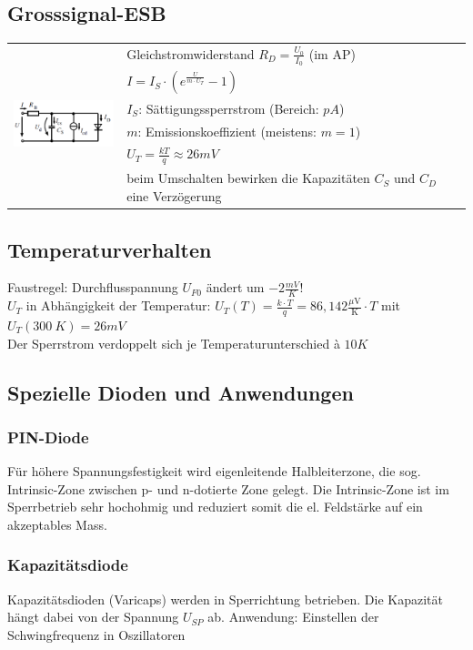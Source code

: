 	\subsection{Grosssignal-ESB}
		\begin{tabular}{l l}
			\multirow{6}{*}{\includegraphics[width=4cm]{./images/Diode-GS-ESB.png}}
			& Gleichstromwiderstand $R_D = \frac{U_0}{I_0}$ (im AP)\\
			& $I=I_S \cdot (e^{\frac{U}{m \cdot U_T}}-1)$ \\
			& $I_S$: Sättigungssperrstrom (Bereich: $pA$)\\
			& $m$: Emissionskoeffizient (meistens: $m=1$) \\
			& $U_T=\frac{kT}{q} \approx 26mV$ \\
			& beim Umschalten bewirken die Kapazitäten $C_S$ und $C_D$ eine Verzögerung \\
		\end{tabular}
		
	\subsection{Temperaturverhalten}
		Faustregel: Durchflusspannung $U_{F0}$ ändert um $-2 \frac{mV}{K}$! \\
		$U_T$ in Abhängigkeit der Temperatur: 
		$U_T(T) = \frac{k \cdot T}{q} = 86,142 \frac{\mu \text{V}}{\text{K}} \cdot T$
		mit $U_T(300 \: K) = 26 mV$ \\
		Der Sperrstrom verdoppelt sich je Temperaturunterschied à $10K$
	
	
	\subsection{Spezielle Dioden und Anwendungen}
		\subsubsection{PIN-Diode}
			Für höhere Spannungsfestigkeit wird eigenleitende Halbleiterzone, die sog. 
			Intrinsic-Zone zwischen p- und n-dotierte Zone gelegt. Die Intrinsic-Zone
			ist im Sperrbetrieb sehr hochohmig und reduziert somit die el. Feldstärke
			auf ein akzeptables Mass.
		
		\subsubsection{Kapazitätsdiode}
			Kapazitätsdioden (Varicaps) werden in Sperrichtung betrieben. Die 
			Kapazität hängt dabei von der Spannung $U_{SP}$ ab.
			Anwendung: Einstellen der Schwingfrequenz in Oszillatoren \\
			
